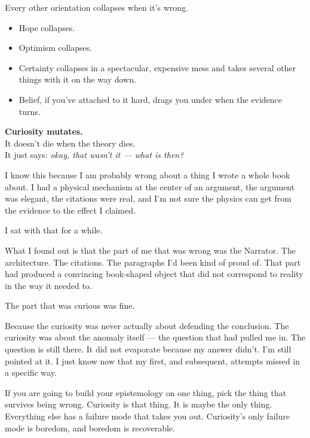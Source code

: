 \documentclass[11pt, letterpaper]{article}
\begin{document}
\begin{tcolorbox}[
  colback=warmgray, colframe=slategray,
  boxrule=0.8pt, arc=2pt,
  left=12pt, right=12pt, top=10pt, bottom=10pt,
]
Every other orientation collapses when it's wrong.

\begin{itemize}[leftmargin=1.4em, itemsep=1pt, topsep=2pt]
  \item Hope collapses.
  \item Optimism collapses.
  \item Certainty collapses in a spectacular, expensive mess and takes several other things with it on the way down.
  \item Belief, if you've attached to it hard, drags you under when the evidence turns.
\end{itemize}

\textbf{Curiosity mutates.}\\
It doesn't die when the theory dies. \\
It just says: \textit{okay, that wasn't it --- what is then?}
\end{tcolorbox}

I know this because I am probably wrong about a thing I wrote a whole book about. I had a physical mechanism at the center of an argument, the argument was elegant, the citations were real, and I'm not sure the physics can get from the evidence to the effect I claimed.

I sat with that for a while.

What I found out is that the part of me that was wrong was the Narrator. The architecture. The citations. The paragraphs I'd been kind of proud of. That part had produced a convincing book-shaped object that did not correspond to reality in the way it needed to.

The part that was curious was fine.

Because the curiosity was never actually about defending the conclusion. The curiosity was about the anomaly itself --- the question that had pulled me in. The question is still there. It did not evaporate because my answer didn't. I'm still pointed at it. I just know now that my first, and subsequent, attempts missed in a specific way.

If you are going to build your epistemology on one thing, pick the thing that survives being wrong. Curiosity is that thing. It is maybe the only thing. Everything else has a failure mode that takes you out. Curiosity's only failure mode is boredom, and boredom is recoverable.
\end{document}
